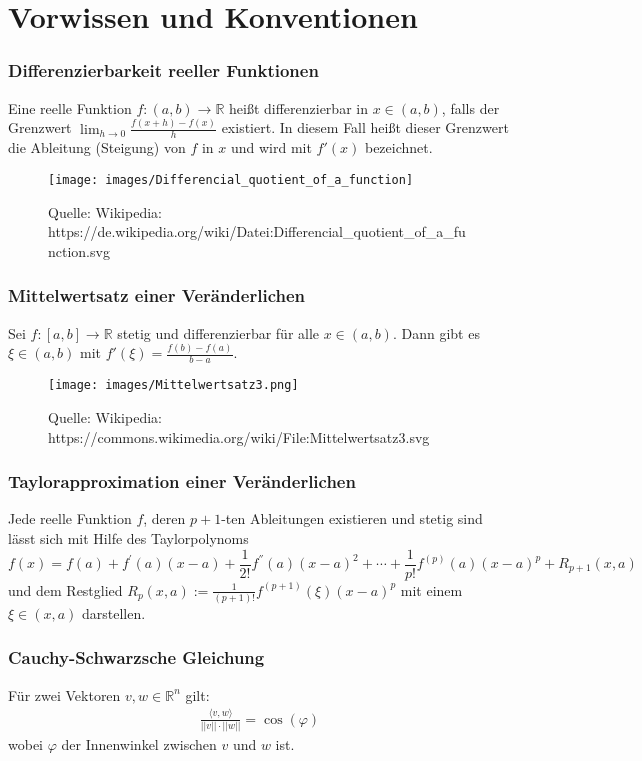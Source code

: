 
\section{Vorwissen und Konventionen}

\subsubsection*{Differenzierbarkeit reeller Funktionen} 
Eine reelle Funktion $f : (a, b) \to \mathbb{R}$  heißt differenzierbar in $x \in (a,b)$, falls der Grenzwert $\lim_{h \to 0}  \frac{f(x +h) - f(x)}  {h}$ existiert. In diesem Fall heißt dieser Grenzwert die Ableitung (Steigung) von $f$ in $x$ und wird mit $f' (x)$ bezeichnet.
\begin{figure}[H]
      \centering
    \texttt{[image: images/Differencial\_quotient\_of\_a\_function]}
      \caption{Quelle: Wikipedia: https://de.wikipedia.org/wiki/Datei:Differencial\_quotient\_of\_a\_function.svg}
\end{figure}

\subsubsection*{Mittelwertsatz einer Veränderlichen} 

Sei $f : [a,b] \to \mathbb{R}$ stetig und differenzierbar für alle $x \in (a,b)$. Dann gibt es $\xi \in (a,b)$ mit
$f'(\xi) = \frac{f(b) - f(a)} { b-a}$.
\begin{figure}[H]
      \centering
    \texttt{[image: images/Mittelwertsatz3.png]}
      \caption{Quelle: Wikipedia: https://commons.wikimedia.org/wiki/File:Mittelwertsatz3.svg}
\end{figure}

\subsubsection*{Taylorapproximation einer Veränderlichen} 

Jede  reelle Funktion $f$, deren $p+1$-ten Ableitungen existieren und stetig sind lässt sich mit Hilfe des Taylorpolynoms  $$f(x) = f(a) + f^{'}(a) (x-a) +   \frac{1}{2!} f^{''}(a) (x-a)^2 + \cdots  +  \frac{1}{p!} f^{(p)}(a) (x-a)^{p} +  R_{p+1}(x,a) $$
und dem Restglied  $R_p(x,a) :=   \frac{1}{(p+1)!} f^{(p+1)}(\xi) (x-a)^{p} $ mit einem $\xi \in (x,a)$ darstellen.


\subsubsection*{Cauchy-Schwarzsche Gleichung}
 Für zwei Vektoren $v,w \in \mathbb{R}^n$ gilt: 
\begin{align*}
\frac{\langle v, w \rangle}{||v|| \cdot ||w||} = \cos(\varphi) 
\end{align*}
wobei $\varphi$ der Innenwinkel zwischen $v$ und $w$ ist.

